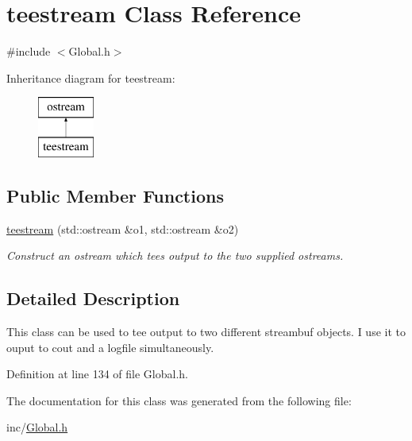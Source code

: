 \hypertarget{classteestream}{}\section{teestream Class Reference}
\label{classteestream}


{\ttfamily \#include $<$Global.\+h$>$}

Inheritance diagram for teestream\+:\begin{figure}[H]
\begin{center}
\leavevmode
\includegraphics[height=2.000000cm]{classteestream}
\end{center}
\end{figure}
\subsection*{Public Member Functions}
\begin{DoxyCompactItemize}
\item 
\hypertarget{classteestream_aa7289fc026f510120ce669da5ad6b92e}{}\hyperlink{classteestream_aa7289fc026f510120ce669da5ad6b92e}{teestream} (std\+::ostream \&o1, std\+::ostream \&o2)\label{classteestream_aa7289fc026f510120ce669da5ad6b92e}

\begin{DoxyCompactList}\small\item\em Construct an ostream which tees output to the two supplied ostreams. \end{DoxyCompactList}\end{DoxyCompactItemize}


\subsection{Detailed Description}
This class can be used to tee output to two different streambuf objects. I use it to ouput to cout and a logfile simultaneously. 

Definition at line 134 of file Global.\+h.



The documentation for this class was generated from the following file\+:\begin{DoxyCompactItemize}
\item 
inc/\hyperlink{Global_8h}{Global.\+h}\end{DoxyCompactItemize}
